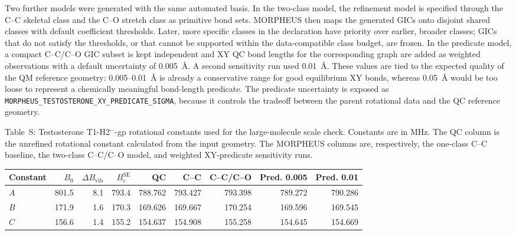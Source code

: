 \documentclass[12pt]{article}
\renewcommand{\thetable}{S\arabic{table}}
\begin{document}
Two further models were generated with the same automated basis. In the
two-class model, the refinement model is specified through the C--C skeletal
class and the C--O stretch class as primitive bond sets. MORPHEUS then maps the
generated GICs onto disjoint shared classes with default coefficient
thresholds. Later, more specific classes in the declaration have priority over
earlier, broader classes; GICs that do not satisfy the thresholds, or that
cannot be supported within the data-compatible class budget, are frozen. In the
predicate model, a compact C--C/C--O GIC subset is kept independent and XY QC
bond lengths for the corresponding graph are added as weighted observations
with a default uncertainty of 0.005~\AA{}. A second sensitivity run used
0.01~\AA{}. These values are tied to the expected quality of the QM reference
geometry: 0.005--0.01~\AA{} is already a conservative range for good
equilibrium XY bonds, whereas 0.05~\AA{} would be too loose to represent a
chemically meaningful bond-length predicate. The predicate uncertainty is
exposed as \texttt{MORPHEUS\_TESTOSTERONE\_XY\_PREDICATE\_SIGMA}, because it
controls the tradeoff between the parent rotational data and the QC reference
geometry.

\begin{center}
\label{tab:si-testosterone-rotconstants}
\parbox{0.94\linewidth}{\small Table~\thetable: Testosterone T1-H2$^{-}$-gp
rotational constants used for the large-molecule scale check. Constants are in
MHz. The QC column is the unrefined rotational constant calculated from the
input geometry. The MORPHEUS columns are, respectively, the one-class C--C
baseline, the two-class C--C/C--O model, and weighted XY-predicate sensitivity
runs.}

\smallskip
\footnotesize
\setlength{\tabcolsep}{3pt}
\begin{tabular}{lrrrrrrrr}
\toprule
Constant & $B_0$ & $\Delta B_\mathrm{vib}$ & $B_e^\mathrm{SE}$ & QC & C--C & C--C/C--O & Pred. 0.005 & Pred. 0.01 \\
\midrule
$A$ & 801.5 & 8.1 & 793.4 & 788.762 & 793.427 & 793.398 & 789.272 & 790.286 \\
$B$ & 171.9 & 1.6 & 170.3 & 169.626 & 169.667 & 170.254 & 169.596 & 169.545 \\
$C$ & 156.6 & 1.4 & 155.2 & 154.637 & 154.908 & 155.258 & 154.645 & 154.669 \\
\bottomrule
\end{tabular}
\end{center}
\end{document}
